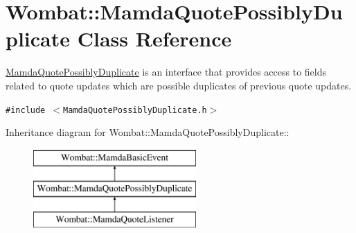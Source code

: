 \hypertarget{classWombat_1_1MamdaQuotePossiblyDuplicate}{
\section{Wombat::Mamda\-Quote\-Possibly\-Duplicate Class Reference}
\label{classWombat_1_1MamdaQuotePossiblyDuplicate}
}
\hyperlink{classWombat_1_1MamdaQuotePossiblyDuplicate}{Mamda\-Quote\-Possibly\-Duplicate} is an interface that provides access to fields related to quote updates which are possible duplicates of previous quote updates.  


{\tt \#include $<$Mamda\-Quote\-Possibly\-Duplicate.h$>$}

Inheritance diagram for Wombat::Mamda\-Quote\-Possibly\-Duplicate::\begin{figure}[H]
\begin{center}
\leavevmode
\includegraphics[height=3cm]{classWombat_1_1MamdaQuotePossiblyDuplicate}
\end{center}
\end{figure}
